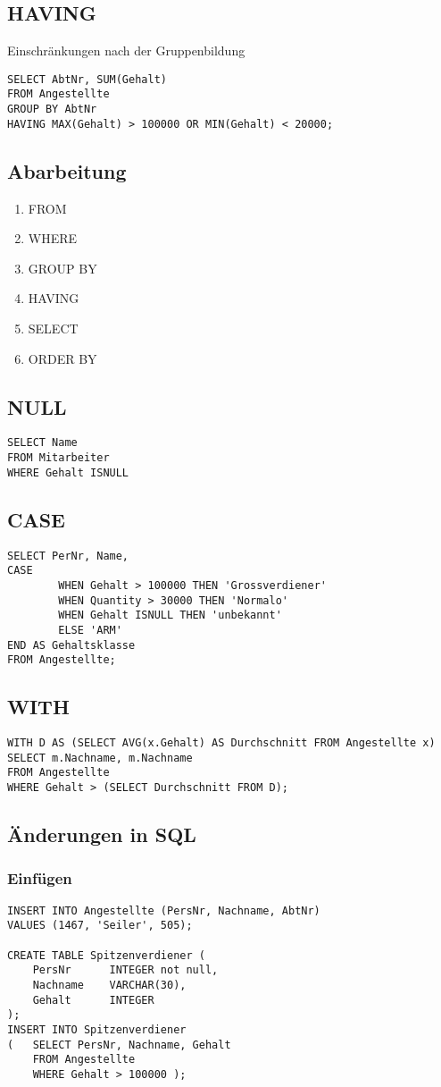 \subsection{HAVING}
Einschränkungen nach der Gruppenbildung
\begin{verbatim}
SELECT AbtNr, SUM(Gehalt)
FROM Angestellte
GROUP BY AbtNr
HAVING MAX(Gehalt) > 100000 OR MIN(Gehalt) < 20000;
\end{verbatim}
\subsection{Abarbeitung}
\begin{enumerate}
	\item FROM
	\item WHERE
	\item GROUP BY
	\item HAVING
	\item SELECT
	\item ORDER BY
\end{enumerate}
\subsection{NULL}
\begin{verbatim}
SELECT Name
FROM Mitarbeiter
WHERE Gehalt ISNULL
\end{verbatim}
\subsection{CASE}
\begin{verbatim}
SELECT PerNr, Name, 
CASE 
		WHEN Gehalt > 100000 THEN 'Grossverdiener'
		WHEN Quantity > 30000 THEN 'Normalo'
		WHEN Gehalt ISNULL THEN 'unbekannt'
		ELSE 'ARM'
END AS Gehaltsklasse
FROM Angestellte;
\end{verbatim}
\subsection{WITH}
\begin{verbatim}
WITH D AS (SELECT AVG(x.Gehalt) AS Durchschnitt FROM Angestellte x)
SELECT m.Nachname, m.Nachname
FROM Angestellte
WHERE Gehalt > (SELECT Durchschnitt FROM D);
\end{verbatim}
\subsection{Änderungen in SQL}
\subsubsection{Einfügen}
\begin{verbatim}
INSERT INTO Angestellte (PersNr, Nachname, AbtNr)
VALUES (1467, 'Seiler', 505);

CREATE TABLE Spitzenverdiener (
	PersNr		INTEGER not null,
	Nachname	VARCHAR(30),
	Gehalt		INTEGER
);
INSERT INTO Spitzenverdiener
(	SELECT PersNr, Nachname, Gehalt
	FROM Angestellte
	WHERE Gehalt > 100000 );
\end{verbatim}
